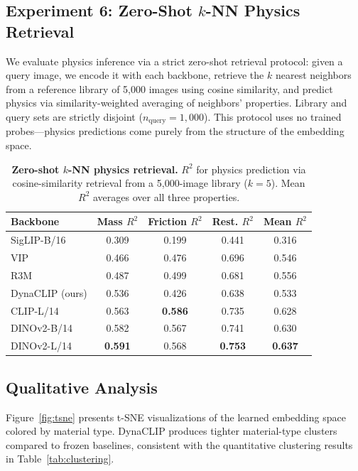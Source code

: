 \documentclass{article}
\newcommand{\methodname}{DynaCLIP}
\begin{document}
\subsection{Experiment 6: Zero-Shot $k$-NN Physics Retrieval}
\label{sec:exp6}

We evaluate physics inference via a strict zero-shot retrieval protocol: given a query image, we encode it with each backbone, retrieve the $k$ nearest neighbors from a reference library of 5{,}000 images using cosine similarity, and predict physics via similarity-weighted averaging of neighbors' properties. Library and query sets are strictly disjoint ($n_\text{query}{=}1{,}000$). This protocol uses no trained probes---physics predictions come purely from the structure of the embedding space.

\begin{table}[h]
\centering
\caption{\textbf{Zero-shot $k$-NN physics retrieval.} $R^2$ for physics prediction via cosine-similarity retrieval from a 5{,}000-image library ($k{=}5$). Mean $R^2$ averages over all three properties.}
\label{tab:zeroshot}
\begin{tabular}{lcccc}
\toprule
\textbf{Backbone} & \textbf{Mass $R^2$} & \textbf{Friction $R^2$} & \textbf{Rest. $R^2$} & \textbf{Mean $R^2$} \\
\midrule
SigLIP-B/16       & 0.309 & 0.199 & 0.441 & 0.316 \\
VIP~\cite{ma2022vip}             & 0.466 & 0.476 & 0.696 & 0.546 \\
R3M~\cite{nair2022r3m}             & 0.487 & 0.499 & 0.681 & 0.556 \\
DynaCLIP (ours)   & 0.536 & 0.426 & 0.638 & 0.533 \\
CLIP-L/14         & 0.563 & \textbf{0.586} & 0.735 & 0.628 \\
DINOv2-B/14       & 0.582 & 0.567 & 0.741 & 0.630 \\
DINOv2-L/14       & \textbf{0.591} & 0.568 & \textbf{0.753} & \textbf{0.637} \\
\bottomrule
\end{tabular}
\end{table}


\subsection{Qualitative Analysis}
\label{sec:qualitative}

Figure~\ref{fig:tsne} presents t-SNE visualizations of the learned embedding space colored by material type. \methodname{} produces tighter material-type clusters compared to frozen baselines, consistent with the quantitative clustering results in Table~\ref{tab:clustering}.
\end{document}
